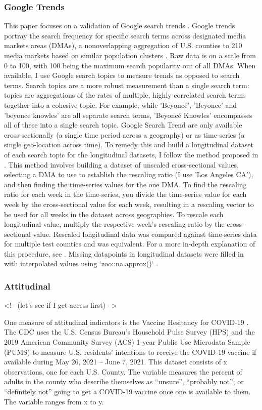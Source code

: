 \subsubsection{Google Trends}
This paper focuses on a validation of Google search trends \citep{googletrends}.
Google trends portray the search frequency for specific search terms across
designated media markets areas (DMAs), a nonoverlapping aggregation of U.S.
counties to 210 media markets based on similar population clusters \citep{dma_key}.
Raw data is on a scale from 0 to 100, with 100 being the maximum search
popularity out of all DMAs. When available, I use Google search topics to
measure trends as opposed to search terms. Search topics are a more robust
measurement than a single search term: topics are aggregations of the rates of
multiple, highly correlated search terms together into a cohesive topic. For
example, while 'Beyoncé', 'Beyonce' and 'beyonce knowles' are all separate
search terms, 'Beyoncé Knowles' encompasses all of these into a single search
topic. Google Search Trend are only available cross-sectionally (a single time
period across a geography) or as time-series (a single geo-location across
time). To remedy this and build a longitudinal dataset of each search topic for
the longitudinal datasets, I follow the method proposed in \citet[p. 5]{park_etal}.
This method involves building a dataset of unscaled cross-sectional values,
selecting a DMA to use to establish the rescaling ratio (I use 'Los Angeles
CA'), and then finding the time-series values for the one DMA. To find the
rescaling ratio for each week in the time-series, you divide the time-series
value for each week by the cross-sectional value for each week, resulting in a
rescaling vector to be used for all weeks in the dataset across geographies. To
rescale each longitudinal value, multiply the respective week's rescaling ratio
by the cross-sectional value. Rescaled longitudinal data was compared against
time-series data for multiple test counties and was equivalent. For a more
in-depth explanation of this procedure, see \citet[p. 5]{park_etal}. Missing
datapoints in longitudinal datasets were filled in with interpolated values
using `zoo::na.approx()` \citep{zoo}.

\subsubsection{Attitudinal}
<!-- \citep{gss_data} (let's see if I get access first) -->

One measure of attitudinal indicators is the Vaccine Hesitancy for COVID-19
\citep{vaches_data}. The CDC uses the U.S. Census Bureau’s Household Pulse Survey
(HPS) and the 2019 American Community Survey (ACS) 1-year Public Use Microdata
Sample (PUMS) to measure U.S. residents’ intentions to receive the COVID-19
vaccine if available during May 26, 2021 – June 7, 2021. This dataset consists
of x observations, one for each U.S. County. The variable
measures the percent of adults in the county who describe themselves as
“unsure”, “probably not”, or “definitely not” going to get a COVID-19 vaccine
once one is available to them. The variable ranges from x to y. 

